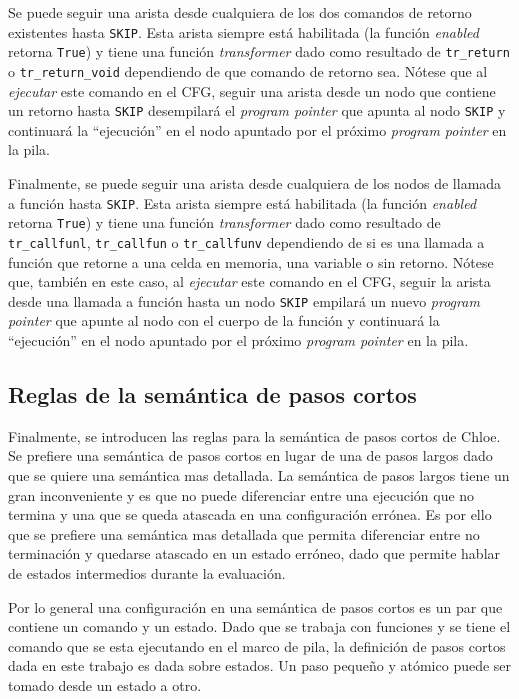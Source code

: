 Se puede seguir una arista desde cualquiera de los dos comandos de retorno existentes hasta \verb|SKIP|.
Esta arista siempre está habilitada (la función \textit{enabled} retorna \verb|True|) y tiene una función \textit{transformer} dado como resultado de \verb|tr_return| o \verb|tr_return_void| dependiendo de que comando de retorno sea.
Nótese que al \textit{ejecutar} este comando en el CFG, seguir una arista desde un nodo que contiene un retorno hasta \verb|SKIP| desempilará el \textit{program pointer} que apunta al nodo \verb|SKIP| y continuará la ``ejecución'' en el nodo apuntado por el próximo \textit{program pointer} en la pila.

Finalmente, se puede seguir una arista desde cualquiera de los nodos de llamada a función hasta \verb|SKIP|.
Esta arista siempre está habilitada (la función \textit{enabled} retorna \verb|True|) y tiene una función \textit{transformer} dado como resultado de \verb|tr_callfunl|, \verb|tr_callfun| o \verb|tr_callfunv| dependiendo de si es una llamada a función que retorne a una celda en memoria, una variable o sin retorno.
Nótese que, también en este caso, al \textit{ejecutar} este comando en el CFG, seguir la arista desde una llamada a función hasta un nodo \verb|SKIP| empilará un nuevo \textit{program pointer} que apunte al nodo con el cuerpo de la función y continuará la ``ejecución'' en el nodo apuntado por el próximo \textit{program pointer} en la pila.

\subsection{Reglas de la semántica de pasos cortos}\label{subsection:rules_small_step}

Finalmente, se introducen las reglas para la semántica de pasos cortos de Chloe.
Se prefiere una semántica de pasos cortos en lugar de una de pasos largos dado que se quiere una semántica mas detallada.
La semántica de pasos largos tiene un gran inconveniente y es que no puede diferenciar entre una ejecución que no termina y una que se queda atascada en una configuración errónea.
Es por ello que se prefiere una semántica mas detallada que permita diferenciar entre no terminación y quedarse atascado en un estado erróneo, dado que permite hablar de estados intermedios durante la evaluación.

Por lo general una configuración en una semántica de pasos cortos es un par que contiene un comando y un estado.
Dado que se trabaja con funciones y se tiene el comando que se esta ejecutando en el marco de pila, la definición de pasos cortos dada en este trabajo es dada sobre estados.
Un paso pequeño y atómico puede ser tomado desde un estado a otro.

